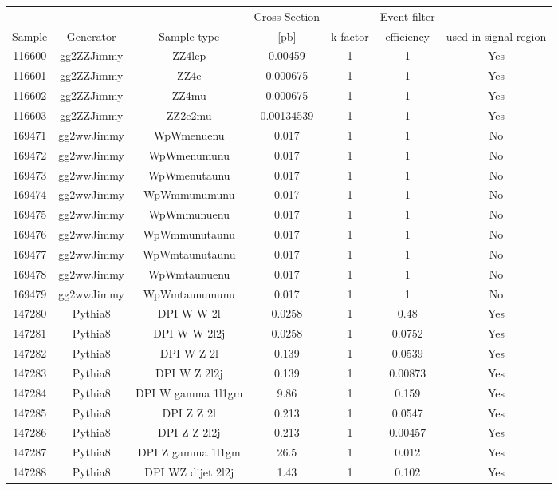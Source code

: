 \begin{table}[ht!]
  \centering
  \begin{footnotesize}
\begin{tabular}{c|c|c|c|c|c|c}
\hline
    &  &  & Cross-Section &  & Event filter  \\
  Sample  & Generator & Sample type & [pb] & k-factor &  efficiency  & used in signal region\\
\hline \hline
116600 & gg2ZZJimmy & ZZ4lep & 0.00459 & 1 & 1 & Yes \\
116601 & gg2ZZJimmy & ZZ4e & 0.000675 & 1 & 1  & Yes \\
116602 & gg2ZZJimmy & ZZ4mu & 0.000675 & 1 & 1  & Yes \\
116603 & gg2ZZJimmy & ZZ2e2mu & 0.00134539 & 1 & 1 & Yes  \\
169471 & gg2wwJimmy & WpWmenuenu & 0.017 & 1 & 1   & No \\
169472 & gg2wwJimmy & WpWmenumunu & 0.017 & 1 & 1  & No  \\
169473 & gg2wwJimmy & WpWmenutaunu & 0.017 & 1 & 1 & No  \\
169474 & gg2wwJimmy & WpWmmunumunu & 0.017 & 1 & 1 & No   \\
169475 & gg2wwJimmy & WpWmmunuenu & 0.017 & 1 & 1  & No  \\
169476 & gg2wwJimmy & WpWmmunutaunu & 0.017 & 1 & 1  & No  \\
169477 & gg2wwJimmy & WpWmtaunutaunu & 0.017 & 1 & 1 & No   \\
169478 & gg2wwJimmy & WpWmtaunuenu & 0.017 & 1 & 1   & No \\
169479 & gg2wwJimmy & WpWmtaunumunu & 0.017 & 1 & 1  & No  \\
147280 & Pythia8 & DPI W W 2l & 0.0258 & 1 & 0.48 & Yes  \\
147281 & Pythia8 & DPI W W 2l2j & 0.0258 & 1 & 0.0752 & Yes  \\
147282 & Pythia8 & DPI W Z 2l & 0.139 & 1 & 0.0539 & Yes  \\
147283 & Pythia8 & DPI W Z 2l2j & 0.139 & 1 & 0.00873 & Yes  \\
147284 & Pythia8 & DPI W gamma 1l1gm & 9.86 & 1 & 0.159 & Yes  \\
147285 & Pythia8 & DPI Z Z 2l & 0.213 & 1 & 0.0547 & Yes  \\
147286 & Pythia8 & DPI Z Z 2l2j & 0.213 & 1 & 0.00457 & Yes  \\
147287 & Pythia8 & DPI Z gamma 1l1gm & 26.5 & 1 & 0.012 & Yes  \\
147288 & Pythia8 & DPI WZ dijet 2l2j & 1.43 & 1 & 0.102 & Yes  \\

\end{tabular}
\end{footnotesize}
\end{table}
